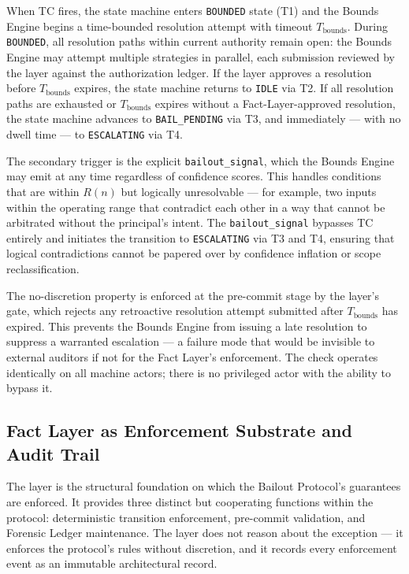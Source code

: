 When TC fires, the state machine enters \texttt{BOUNDED} state (T1) and the Bounds Engine begins a time-bounded resolution attempt with timeout $T_{\text{bounds}}$. During \texttt{BOUNDED}, all resolution paths within current authority remain open: the Bounds Engine may attempt multiple strategies in parallel, each submission reviewed by the \fact{} layer against the authorization ledger. If the \fact{} layer approves a resolution before $T_{\text{bounds}}$ expires, the state machine returns to \texttt{IDLE} via T2. If all resolution paths are exhausted or $T_{\text{bounds}}$ expires without a Fact-Layer-approved resolution, the state machine advances to \texttt{BAIL\_PENDING} via T3, and immediately — with no dwell time — to \texttt{ESCALATING} via T4.

The secondary trigger is the explicit \texttt{bailout\_signal}, which the Bounds Engine may emit at any time regardless of confidence scores. This handles conditions that are within $R(n)$ but logically unresolvable — for example, two inputs within the operating range that contradict each other in a way that cannot be arbitrated without the principal's intent. The \texttt{bailout\_signal} bypasses TC entirely and initiates the transition to \texttt{ESCALATING} via T3 and T4, ensuring that logical contradictions cannot be papered over by confidence inflation or scope reclassification.

The no-discretion property is enforced at the pre-commit stage by the \fact{} layer's gate, which rejects any retroactive resolution attempt submitted after $T_{\text{bounds}}$ has expired. This prevents the Bounds Engine from issuing a late resolution to suppress a warranted escalation — a failure mode that would be invisible to external auditors if not for the Fact Layer's enforcement. The check operates identically on all machine actors; there is no privileged actor with the ability to bypass it.

\subsection{Fact Layer as Enforcement Substrate and Audit Trail}
\label{sec:bailout-fact-layer}

The \fact{} layer is the structural foundation on which the Bailout Protocol's guarantees are enforced. It provides three distinct but cooperating functions within the protocol: deterministic transition enforcement, pre-commit validation, and Forensic Ledger maintenance. The \fact{} layer does not reason about the exception — it enforces the protocol's rules without discretion, and it records every enforcement event as an immutable architectural record.

